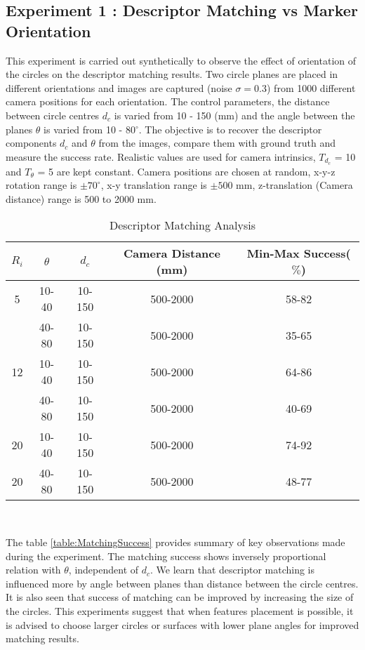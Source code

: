 \documentclass{bmvc2k}
\begin{document}
\subsection{Experiment 1 : Descriptor Matching vs Marker Orientation}
This experiment is carried out synthetically to observe the effect of orientation of the circles on the descriptor matching results.
Two circle planes are placed in different orientations and images are captured (noise $ \sigma = 0.3 $) from 1000 different camera positions for each orientation. 
The control parameters, the distance between circle centres $ d_c $ is varied from 10 - 150 (mm) and the angle between the planes $ \theta $ is varied from 10 - 80$ ^\circ $. 
The objective is to recover the descriptor components $ d_c $ and $ \theta $ from the images, compare them with ground truth and measure the success rate. 
Realistic values are used for camera intrinsics, $ T_{d_c} $ = 10 and $ T_\theta $ = 5 are kept constant. 
Camera positions are chosen at random, x-y-z rotation range is $ \pm 70^\circ $, x-y translation range is $ \pm 500 $ mm, z-translation (Camera distance) range is 500 to 2000 mm. 

\begin{table}
\centering
\caption{Descriptor Matching Analysis } \label{table:MatchingSuccess}
\begin{tabular}{|c | c | c | c | c |}
\hline
$ R_i $ & $ \theta $ & $ d_c $ & Camera Distance (mm) & Min-Max Success($ \% $) \\ \hline
5 & 10-40 & 10-150 & 500-2000 & 58-82 \\
 & 40-80 & 10-150 & 500-2000 & 35-65 \\ \hline
12 & 10-40 & 10-150 & 500-2000 & 64-86 \\
& 40-80 & 10-150& 500-2000 & 40-69 \\ \hline
 20 & 10-40 & 10-150 & 500-2000 & 74-92 \\
 20 & 40-80 & 10-150 & 500-2000  & 48-77 \\ \hline 
\end{tabular} \\
\label{tab:Exp1}
\end{table}
The table \ref{table:MatchingSuccess} provides summary of key observations made during the experiment. 
The matching success shows inversely proportional relation with $ \theta $, independent of $ d_c $. 
We learn that descriptor matching is influenced more by angle between planes than distance between the circle centres. 
It is also seen that success of matching can be improved by increasing the size of the circles. 
This experiments suggest that when features placement is possible, it is advised to choose larger circles or surfaces with lower plane angles for improved matching results. 
\end{document}
